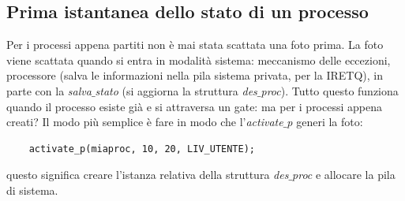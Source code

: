 \subsection{Prima istantanea dello stato di un processo} Per i processi appena partiti non è mai stata scattata una foto prima. La foto viene scattata quando si entra in modalità sistema: meccanismo delle eccezioni, processore (salva le informazioni nella pila sistema privata, per la IRETQ), in parte con la \emph{salva$\_$stato} (si aggiorna la struttura \emph{des$\_$proc}). Tutto questo funziona quando il processo esiste già e si attraversa un gate: ma per i processi appena creati? Il modo più semplice è fare in modo che l'\emph{activate$\_$p} generi la foto: 
\begin{verbatim}
	activate_p(miaproc, 10, 20, LIV_UTENTE);
\end{verbatim}
questo significa creare l'istanza relativa della struttura \emph{des$\_$proc} e allocare la pila di sistema.
